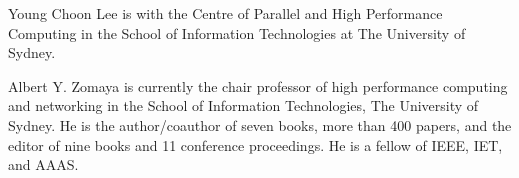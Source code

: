 \documentclass[10pt,journal,cspaper,compsoc]{IEEEtran}
\begin{document}
\begin{IEEEbiographynophoto}{Young Choon Lee}
is with the Centre of Parallel and High Performance Computing in the School of Information Technologies at The University of Sydney.
\end{IEEEbiographynophoto}

\begin{IEEEbiographynophoto}{Albert Y. Zomaya}
is currently the chair professor of high performance computing and networking in the School of Information Technologies, The University of Sydney. He is the author/coauthor of seven books, more than 400 papers, and the editor of nine books and 11 conference proceedings. He is a fellow of IEEE, IET, and AAAS.
\end{IEEEbiographynophoto}
\end{document}
